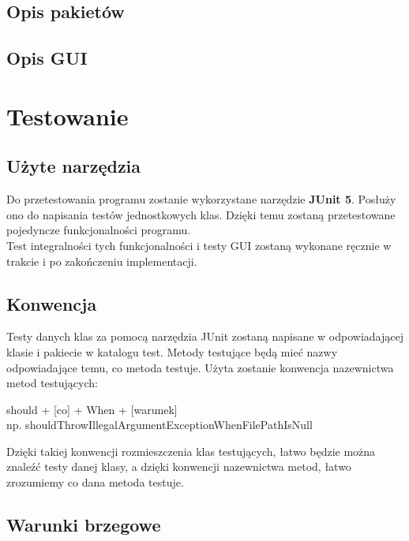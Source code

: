 \documentclass{article}
\begin{document}
    \subsection{Opis pakietów}
    
    \subsection{Opis GUI}

        
\section{Testowanie}
    \subsection{Użyte narzędzia}
        Do przetestowania programu zostanie wykorzystane narzędzie \textbf{JUnit 5}.
        Posłuży ono do napisania testów jednostkowych klas.
        Dzięki temu zostaną przetestowane pojedyncze funkcjonalności programu.
        \\
        Test integralności tych funkcjonalności i testy GUI zostaną wykonane ręcznie w trakcie i po zakończeniu implementacji.
    
    \subsection{Konwencja}
        Testy danych klas za pomocą narzędzia JUnit zostaną napisane w odpowiadającej klasie i pakiecie w katalogu test.
        Metody testujące będą mieć nazwy odpowiadające temu, co metoda testuje.
        Użyta zostanie konwencja nazewnictwa metod testujących: 
        \begin{center}
            should + [co] + When + [warunek]\\
            np. shouldThrowIllegalArgumentExceptionWhenFilePathIsNull
        \end{center}
        Dzięki takiej konwencji rozmieszczenia klas testujących, łatwo będzie można znaleźć testy danej klasy, a dzięki konwencji nazewnictwa metod, łatwo zrozumiemy co dana metoda testuje.
    
    \subsection{Warunki brzegowe}
\end{document}
